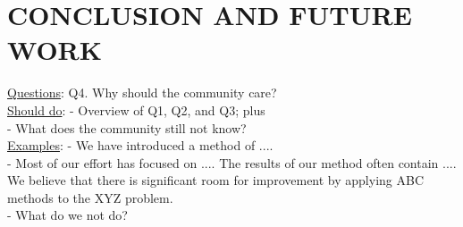 
\section{CONCLUSION AND FUTURE WORK}
\uline{Questions}: Q4. Why should the community care?\\

\noindent\uline{Should do}: 
- Overview of Q1, Q2, and Q3; plus\\
- What does the community still not know?\\

\noindent\uline{Examples}:
- We have introduced a method of ....\\
- Most of our effort has focused on .... The results of our method often contain .... We believe that there is significant room for improvement by applying ABC methods to the XYZ problem.\\
- What do we not do?